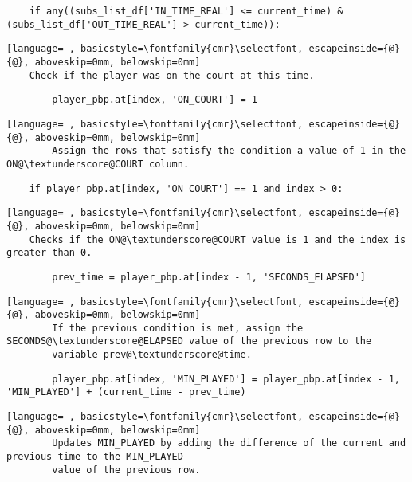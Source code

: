 \documentclass{article}
\begin{document}
\begin{lstlisting}
    if any((subs_list_df['IN_TIME_REAL'] <= current_time) & (subs_list_df['OUT_TIME_REAL'] > current_time)):
\end{lstlisting}
\begin{lstlisting}[language= , basicstyle=\fontfamily{cmr}\selectfont, escapeinside={@}{@}, aboveskip=0mm, belowskip=0mm]
    Check if the player was on the court at this time.
\end{lstlisting}
\begin{lstlisting}
        player_pbp.at[index, 'ON_COURT'] = 1
\end{lstlisting}
\begin{lstlisting}[language= , basicstyle=\fontfamily{cmr}\selectfont, escapeinside={@}{@}, aboveskip=0mm, belowskip=0mm]
        Assign the rows that satisfy the condition a value of 1 in the ON@\textunderscore@COURT column.
\end{lstlisting}
\begin{lstlisting}
    if player_pbp.at[index, 'ON_COURT'] == 1 and index > 0:
\end{lstlisting}
\begin{lstlisting}[language= , basicstyle=\fontfamily{cmr}\selectfont, escapeinside={@}{@}, aboveskip=0mm, belowskip=0mm]
    Checks if the ON@\textunderscore@COURT value is 1 and the index is greater than 0.
\end{lstlisting}
\begin{lstlisting}
        prev_time = player_pbp.at[index - 1, 'SECONDS_ELAPSED']
\end{lstlisting}
\begin{lstlisting}[language= , basicstyle=\fontfamily{cmr}\selectfont, escapeinside={@}{@}, aboveskip=0mm, belowskip=0mm]
        If the previous condition is met, assign the SECONDS@\textunderscore@ELAPSED value of the previous row to the
        variable prev@\textunderscore@time.
\end{lstlisting}
\begin{lstlisting}
        player_pbp.at[index, 'MIN_PLAYED'] = player_pbp.at[index - 1, 'MIN_PLAYED'] + (current_time - prev_time)
\end{lstlisting}
\begin{lstlisting}[language= , basicstyle=\fontfamily{cmr}\selectfont, escapeinside={@}{@}, aboveskip=0mm, belowskip=0mm]
        Updates MIN_PLAYED by adding the difference of the current and previous time to the MIN_PLAYED
        value of the previous row.
\end{lstlisting}
\end{document}
